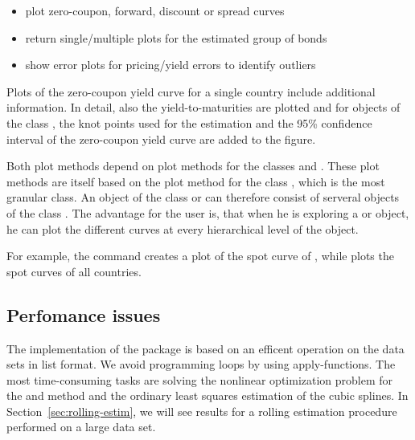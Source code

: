 \begin{itemize}
\item plot zero-coupon, forward, discount or spread curves
\item return single/multiple plots for the estimated group of bonds
\item show error plots for pricing/yield errors to identify outliers
\end{itemize}

Plots of the zero-coupon yield curve for a single country include additional information. In detail, 
also the yield-to-maturities are plotted and for objects of the class , the knot points used for the estimation and the 95\% confidence interval of the zero-coupon yield curve are added to the figure. 

Both plot methods depend on plot methods for the classes  and . These plot methods are itself based on the plot method for the class , which is the most granular class. An object of the class  or  can therefore consist of serveral 
objects of the class . The advantage for the user is, that when he
is exploring a  or  object, he can plot the different curves at every hierarchical level of the object.

For example, the command  creates a plot of the spot curve of , while  plots the spot curves of all countries. 


\subsection{Perfomance issues}
\label{sec:perfomance-issues}

The implementation of the  package is based on an efficent operation on the data sets in list format. We avoid programming loops by using apply-functions. The most time-consuming tasks are solving the nonlinear optimization problem for the \cite{Nelson1987} and \cite{Svensson1994} method and the ordinary least squares estimation of the \cite{McCulloch1975} cubic splines. In Section~\ref{sec:rolling-estim}, we will see results for a rolling estimation procedure performed on a large data set.



